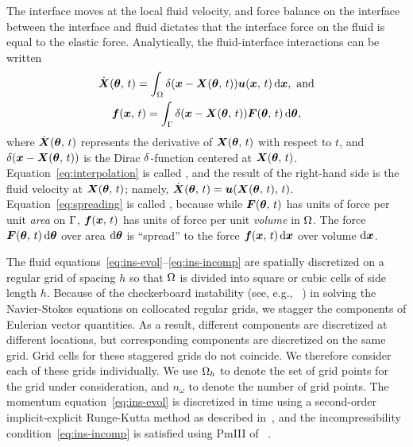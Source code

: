 The interface moves at the local fluid velocity, and force balance on the interface
between the interface and fluid dictates that the interface force on the fluid is equal
to the elastic force. Analytically, the fluid-interface interactions can be written
\begin{gather}
    \label{eq:interpolation}
    \U(\params,\,t) = \int_\domain \Dirac(\x-\X(\params,\,t)) \u(\x,\,t)\d\x,\ \text{and} \\
    \label{eq:spreading}
    \f(\x,\,t) = \int_\interface \Dirac(\x-\X(\params,\,t))\F(\params,\,t)\d\params,
\end{gather}
where $\dot{\boldsymbol{X}}(\boldsymbol{\theta},\,t)$ represents the derivative of $\boldsymbol{X}(\boldsymbol{\theta},\,t)$ with respect to
$t$, and $\delta(\boldsymbol{x}-\boldsymbol{X}(\boldsymbol{\theta},\,t))$ is the Dirac $\delta$-function centered at
$\boldsymbol{X}(\boldsymbol{\theta},\,t)$. Equation~\eqref{eq:interpolation} is called , and
the result of the right-hand side is the fluid velocity at $\boldsymbol{X}(\boldsymbol{\theta},\,t)$; namely,
$\dot{\boldsymbol{X}}(\boldsymbol{\theta},\,t) = \boldsymbol{u}(\boldsymbol{X}(\boldsymbol{\theta},\,t),\,t)$. Equation~\eqref{eq:spreading} is called
, because while $\boldsymbol{F}(\boldsymbol{\theta},\,t)$ has units of force per unit \emph{area}
on $\Gamma$, $\boldsymbol{f}(\boldsymbol{x},\,t)$ has units of force per unit \emph{volume} in $\Omega$. The
force $\F(\params,\,t)\d\params$ over area $\d\params$ is ``spread'' to the force
$\f(\x,\,t)\d\x$ over volume $\d\x$. 

The fluid equations~\eqref{eq:ins-evol}--\eqref{eq:ins-incomp} are spatially discretized
on a regular grid of spacing $h$ so that $\Omega$ is divided into square or cubic cells
of side length $h$. Because of the checkerboard instability (see, e.g.,~%
\cite{Wesseling:2001ci}) in solving the Navier-Stokes equations on collocated regular
grids, we stagger the components of Eulerian vector quantities. As a result, different
components are discretized at different locations, but corresponding components are
discretized on the same grid. Grid cells for these staggered grids do not coincide. We
therefore consider each of these grids individually. We use $\Omega_h$ to denote the set
of grid points for the grid under consideration, and $n_\omega$ to denote the number of
grid points. The momentum equation~\eqref{eq:ins-evol} is discretized in time using a
second-order implicit-explicit Runge-Kutta method as described in~\cite{Peskin:2002go},
and the incompressibility condition~\eqref{eq:ins-incomp} is satisfied using PmIII of~%
\cite{Brown:2001bq}.

